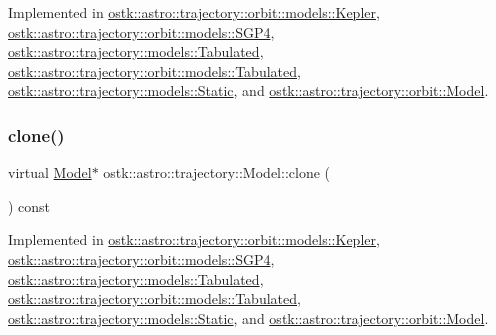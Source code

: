 Implemented in \hyperlink{classostk_1_1astro_1_1trajectory_1_1orbit_1_1models_1_1_kepler_a4de0c3d7a2b37c1c2ab4d6e207339809}{ostk\+::astro\+::trajectory\+::orbit\+::models\+::\+Kepler}, \hyperlink{classostk_1_1astro_1_1trajectory_1_1orbit_1_1models_1_1_s_g_p4_ad88439d9c46a75d3da8c20d2872271e3}{ostk\+::astro\+::trajectory\+::orbit\+::models\+::\+S\+G\+P4}, \hyperlink{classostk_1_1astro_1_1trajectory_1_1models_1_1_tabulated_af2ebaa6456986636aa58c2f8666ed0b9}{ostk\+::astro\+::trajectory\+::models\+::\+Tabulated}, \hyperlink{classostk_1_1astro_1_1trajectory_1_1orbit_1_1models_1_1_tabulated_ad7935cafe71b572b97b9df93e469d2f8}{ostk\+::astro\+::trajectory\+::orbit\+::models\+::\+Tabulated}, \hyperlink{classostk_1_1astro_1_1trajectory_1_1models_1_1_static_a4297a74c953a105dc887a31227fbe1ff}{ostk\+::astro\+::trajectory\+::models\+::\+Static}, and \hyperlink{classostk_1_1astro_1_1trajectory_1_1orbit_1_1_model_a34a0d8979ec1f7ade3e434fc0dad3711}{ostk\+::astro\+::trajectory\+::orbit\+::\+Model}.

\mbox{\label{classostk_1_1astro_1_1trajectory_1_1_model_ad9f1467f711b07796ddc1437fb9ad9df}} 
\subsubsection{\texorpdfstring{clone()}{clone()}}
{\footnotesize\ttfamily virtual \hyperlink{classostk_1_1astro_1_1trajectory_1_1_model}{Model}$\ast$ ostk\+::astro\+::trajectory\+::\+Model\+::clone (\begin{DoxyParamCaption}{ }\end{DoxyParamCaption}) const\hspace{0.3cm}{\ttfamily [pure virtual]}}



Implemented in \hyperlink{classostk_1_1astro_1_1trajectory_1_1orbit_1_1models_1_1_kepler_afb76b3571c73fb5c87129033f7d66520}{ostk\+::astro\+::trajectory\+::orbit\+::models\+::\+Kepler}, \hyperlink{classostk_1_1astro_1_1trajectory_1_1orbit_1_1models_1_1_s_g_p4_afb9928e09d66c13a77eb1126da6139eb}{ostk\+::astro\+::trajectory\+::orbit\+::models\+::\+S\+G\+P4}, \hyperlink{classostk_1_1astro_1_1trajectory_1_1models_1_1_tabulated_a553d2c4027ce269c1c2b3f4e9c65e14d}{ostk\+::astro\+::trajectory\+::models\+::\+Tabulated}, \hyperlink{classostk_1_1astro_1_1trajectory_1_1orbit_1_1models_1_1_tabulated_a53603727c33f9ff8db520831cf666142}{ostk\+::astro\+::trajectory\+::orbit\+::models\+::\+Tabulated}, \hyperlink{classostk_1_1astro_1_1trajectory_1_1models_1_1_static_abe3edbc72ae2f4fbd6c2593e2aa08755}{ostk\+::astro\+::trajectory\+::models\+::\+Static}, and \hyperlink{classostk_1_1astro_1_1trajectory_1_1orbit_1_1_model_a53dc07564e4c7c444da46360aa8ada15}{ostk\+::astro\+::trajectory\+::orbit\+::\+Model}.

